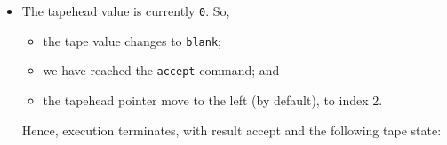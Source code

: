 \documentclass{article}
\theoremstyle{definition}
\begin{document}
\begin{itemize}
        \item The tapehead value is currently \texttt{0}. So,  
        \begin{itemize}
            \item the tape value changes to \texttt{blank};
            \item we have reached the \texttt{accept} command; and
            \item the tapehead pointer move to the left (by default), to index $2$.
        \end{itemize}
        Hence, execution terminates, with result accept and the following tape state:
        \begin{figure}[H]
            \centering
        \end{figure}
    \end{itemize}
\end{document}
